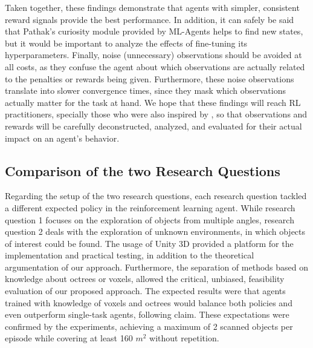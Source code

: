     
        Taken together, these findings demonstrate that agents with simpler, consistent reward signals provide the best performance. 
        In addition, it can safely be said that Pathak's curiosity module provided by ML-Agents helps to find new states, but it would be important to analyze the effects of fine-tuning its hyperparameters.
        Finally, noise (unnecessary) observations should be avoided at all costs, as they confuse the agent about which observations are actually related to the penalties or rewards being given. 
        Furthermore, these noise observations translate into slower convergence times, since they mask which observations actually matter for the task at hand.
        We hope that these findings will reach RL practitioners, specially those who were also inspired by \cite{silver2021reward}, so that observations and rewards will be carefully deconstructed, analyzed, and evaluated for their actual impact on an agent's behavior.




    \subsection{Comparison of the two Research Questions}
        Regarding the setup of the two research questions, each research question tackled a different expected policy in the reinforcement learning agent. While research question 1 focuses on the exploration of objects from multiple angles, research question 2 deals with the exploration of unknown environments, in which objects of interest could be found. The usage of Unity 3D provided a platform for the implementation and practical testing, in addition to the theoretical argumentation of our approach.
        Furthermore, the separation of methods based on knowledge about octrees or voxels, allowed the critical, unbiased, feasibility evaluation of our proposed approach.
        The expected results were that agents trained with knowledge of voxels and octrees would balance both policies and even outperform single-task agents, following \textcite{silver2021reward} claim. These expectations were confirmed by the experiments, achieving a maximum of 2 scanned objects per episode while covering at least 160 $m^2$ without repetition. 
        

